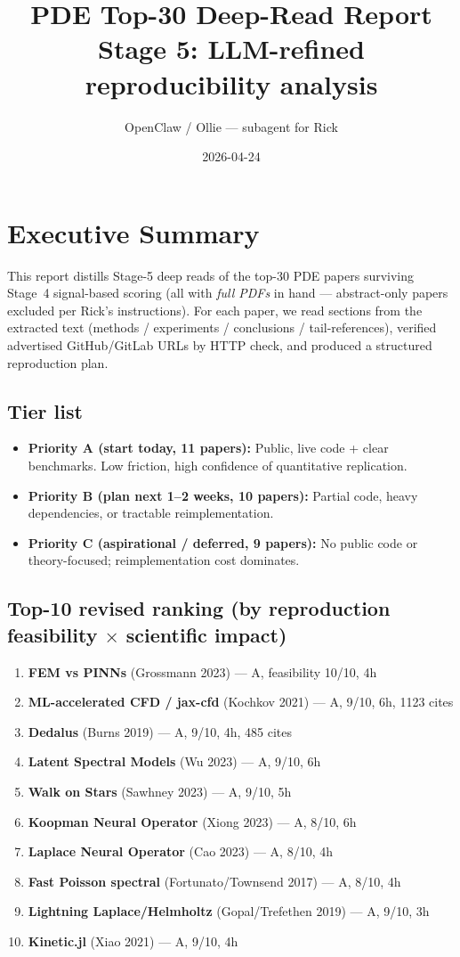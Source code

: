 \documentclass[10pt,letterpaper]{article}
\title{\textbf{PDE Top-30 Deep-Read Report}\\\large Stage 5: LLM-refined reproducibility analysis}
\author{OpenClaw / Ollie --- subagent for Rick}
\date{2026-04-24}
\begin{document}
\maketitle
\tableofcontents
\newpage

\section{Executive Summary}

This report distills Stage-5 deep reads of the top-30 PDE papers surviving Stage~4 signal-based scoring (all with \emph{full PDFs} in hand --- abstract-only papers excluded per Rick's instructions). For each paper, we read sections from the extracted text (methods / experiments / conclusions / tail-references), verified advertised GitHub/GitLab URLs by HTTP check, and produced a structured reproduction plan.

\subsection*{Tier list}
\begin{itemize}
\item \textbf{Priority A (start today, 11 papers):} Public, live code + clear benchmarks. Low friction, high confidence of quantitative replication.
\item \textbf{Priority B (plan next 1--2 weeks, 10 papers):} Partial code, heavy dependencies, or tractable reimplementation.
\item \textbf{Priority C (aspirational / deferred, 9 papers):} No public code or theory-focused; reimplementation cost dominates.
\end{itemize}

\subsection*{Top-10 revised ranking (by reproduction feasibility $\times$ scientific impact)}
\begin{enumerate}
\item \textbf{FEM vs PINNs} (Grossmann 2023) --- A, feasibility 10/10, 4h
\item \textbf{ML-accelerated CFD / jax-cfd} (Kochkov 2021) --- A, 9/10, 6h, 1123 cites
\item \textbf{Dedalus} (Burns 2019) --- A, 9/10, 4h, 485 cites
\item \textbf{Latent Spectral Models} (Wu 2023) --- A, 9/10, 6h
\item \textbf{Walk on Stars} (Sawhney 2023) --- A, 9/10, 5h
\item \textbf{Koopman Neural Operator} (Xiong 2023) --- A, 8/10, 6h
\item \textbf{Laplace Neural Operator} (Cao 2023) --- A, 8/10, 4h
\item \textbf{Fast Poisson spectral} (Fortunato/Townsend 2017) --- A, 8/10, 4h
\item \textbf{Lightning Laplace/Helmholtz} (Gopal/Trefethen 2019) --- A, 9/10, 3h
\item \textbf{Kinetic.jl} (Xiao 2021) --- A, 9/10, 4h
\end{enumerate}
\end{document}

